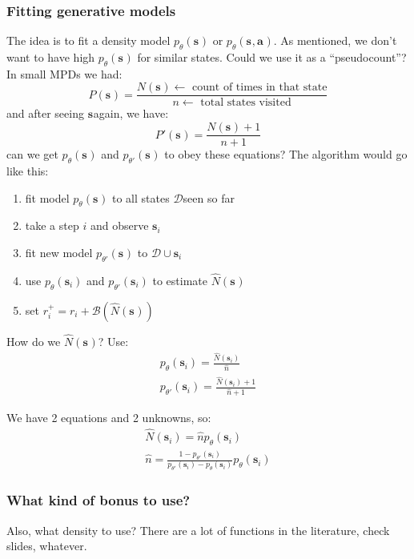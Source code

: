 \documentclass{report}
\begin{document}
\subsubsection{Fitting generative models}
The idea is to fit a density model $ p_\theta(\bm{s}_{})  $ or $ p_\theta (\bm{s}_{}, \bm{a}_{})  $.
As mentioned, we don't want to have high $ p_\theta(\bm{s}_{})  $ for similar states.
Could we use it as a ``pseudocount''?
In small MPDs we had:
\begin{equation}
		P\left( \bm{s}_{} \right) = \frac{N(\bm{s}_{}) \leftarrow \text{ count of times in that state}}{n \leftarrow \text{ total states visited}} 
\end{equation}
and after seeing $ \bm{s}_{}  $again, we have:
\begin{equation}
		P'\left( \bm{s}_{} \right) = \frac{N(\bm{s}_{}) +1 }{n  +1 } 
\end{equation}
can we get $ p_\theta(\bm{s}_{})  $ and $ p_{\theta'}(\bm{s}_{})  $ to obey these equations?
The algorithm would go like this:
\begin{enumerate}
		\item fit model $ p_{\theta}(\bm{s}_{})  $ to all states $ \mathcal{D}  $seen so far
		\item take a step $i$ and observe $ \bm{s}_{i}  $
		\item fit new model $ p_{\theta'}(\bm{s}_{})  $ to $ \mathcal{D}  \cup \bm{s}_{i}$ 
		\item use $ p_{\theta}(\bm{s}_{i})  $ and $ p_{\theta'}(\bm{s}_{i})  $ to estimate $ \hat{N}(\bm{s}_{})  $
		\item set $ r^+_i = r_i + \mathcal{B}(\hat{N}(\bm{s}_{}))  $
\end{enumerate}
How do we $ \hat{ N}(\bm{s}_{})$?
Use:
\begin{gather}
		p_\theta(\bm{s}_{i}) = \frac{\hat{N}(\bm{s}_{i})}{\hat{n}} \\
		p_{\theta'}(\bm{s}_{i}) = \frac{\hat{N}(\bm{s}_{i})+1}{\hat{n}+1} 
\end{gather}

We have 2 equations and 2 unknowns, so:
\begin{gather}
		\hat{N}(\bm{s}_{i}) = \hat{n}p_{\theta}(\bm{s}_{i}) \\
		\hat{n} = \frac{1 - p_{\theta'}(\bm{s}_{i})}{p_{\theta'}(\bm{s}_{i}) - p_{\theta}(\bm{s}_{i})} p_{\theta}(\bm{s}_{i})
\end{gather}

\subsubsection{What kind of bonus to use?}
Also, what density to use?
There are a lot of functions in the literature, check slides, whatever.
\end{document}
